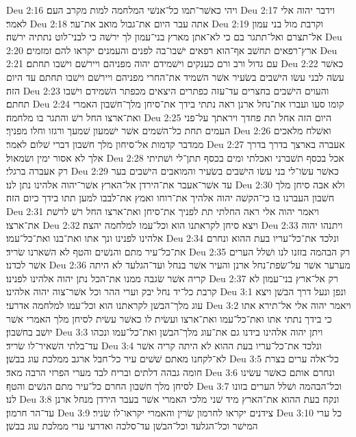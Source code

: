 Deu 2:16  ויהי כאשׁר־תמו כל־אנשׁי המלחמה למות מקרב העם׃
Deu 2:17  וידבר יהוה אלי לאמר׃
Deu 2:18  אתה עבר היום את־גבול מואב את־ער׃
Deu 2:19  וקרבת מול בני עמון אל־תצרם ואל־תתגר בם כי לא־אתן מארץ בני־עמון לך ירשׁה כי לבני־לוט נתתיה ירשׁה׃
Deu 2:20  ארץ־רפאים תחשׁב אף־הוא רפאים ישׁבו־בה לפנים והעמנים יקראו להם זמזמים׃
Deu 2:21  עם גדול ורב ורם כענקים וישׁמידם יהוה מפניהם ויירשׁם וישׁבו תחתם׃
Deu 2:22  כאשׁר עשׂה לבני עשׂו הישׁבים בשׂעיר אשׁר השׁמיד את־החרי מפניהם ויירשׁם וישׁבו תחתם עד היום הזה׃
Deu 2:23  והעוים הישׁבים בחצרים עד־עזה כפתרים היצאים מכפתר השׁמידם וישׁבו תחתם׃
Deu 2:24  קומו סעו ועברו את־נחל ארנן ראה נתתי בידך את־סיחן מלך־חשׁבון האמרי ואת־ארצו החל רשׁ והתגר בו מלחמה׃
Deu 2:25  היום הזה אחל תת פחדך ויראתך על־פני העמים תחת כל־השׁמים אשׁר ישׁמעון שׁמעך ורגזו וחלו מפניך׃
Deu 2:26  ואשׁלח מלאכים ממדבר קדמות אל־סיחון מלך חשׁבון דברי שׁלום לאמר׃
Deu 2:27  אעברה בארצך בדרך בדרך אלך לא אסור ימין ושׂמאול׃
Deu 2:28  אכל בכסף תשׁברני ואכלתי ומים בכסף תתן־לי ושׁתיתי רק אעברה ברגלי׃
Deu 2:29  כאשׁר עשׂו־לי בני עשׂו הישׁבים בשׂעיר והמואבים הישׁבים בער עד אשׁר־אעבר את־הירדן אל־הארץ אשׁר־יהוה אלהינו נתן לנו׃
Deu 2:30  ולא אבה סיחן מלך חשׁבון העברנו בו כי־הקשׁה יהוה אלהיך את־רוחו ואמץ את־לבבו למען תתו בידך כיום הזה׃
Deu 2:31  ויאמר יהוה אלי ראה החלתי תת לפניך את־סיחן ואת־ארצו החל רשׁ לרשׁת את־ארצו׃
Deu 2:32  ויצא סיחן לקראתנו הוא וכל־עמו למלחמה יהצה׃
Deu 2:33  ויתנהו יהוה אלהינו לפנינו ונך אתו ואת־בנו ואת־כל־עמו׃
Deu 2:34  ונלכד את־כל־עריו בעת ההוא ונחרם את־כל־עיר מתם והנשׁים והטף לא השׁארנו שׂריד׃
Deu 2:35  רק הבהמה בזזנו לנו ושׁלל הערים אשׁר לכדנו׃
Deu 2:36  מערער אשׁר על־שׂפת־נחל ארנן והעיר אשׁר בנחל ועד־הגלעד לא היתה קריה אשׁר שׂגבה ממנו את־הכל נתן יהוה אלהינו לפנינו׃
Deu 2:37  רק אל־ארץ בני־עמון לא קרבת כל־יד נחל יבק וערי ההר וכל אשׁר־צוה יהוה אלהינו׃
Deu 3:1  ונפן ונעל דרך הבשׁן ויצא עוג מלך־הבשׁן לקראתנו הוא וכל־עמו למלחמה אדרעי׃
Deu 3:2  ויאמר יהוה אלי אל־תירא אתו כי בידך נתתי אתו ואת־כל־עמו ואת־ארצו ועשׂית לו כאשׁר עשׂית לסיחן מלך האמרי אשׁר יושׁב בחשׁבון׃
Deu 3:3  ויתן יהוה אלהינו בידנו גם את־עוג מלך־הבשׁן ואת־כל־עמו ונכהו עד־בלתי השׁאיר־לו שׂריד׃
Deu 3:4  ונלכד את־כל־עריו בעת ההוא לא היתה קריה אשׁר לא־לקחנו מאתם שׁשׁים עיר כל־חבל ארגב ממלכת עוג בבשׁן׃
Deu 3:5  כל־אלה ערים בצרת חומה גבהה דלתים ובריח לבד מערי הפרזי הרבה מאד׃
Deu 3:6  ונחרם אותם כאשׁר עשׂינו לסיחן מלך חשׁבון החרם כל־עיר מתם הנשׁים והטף׃
Deu 3:7  וכל־הבהמה ושׁלל הערים בזונו לנו׃
Deu 3:8  ונקח בעת ההוא את־הארץ מיד שׁני מלכי האמרי אשׁר בעבר הירדן מנחל ארנן עד־הר חרמון׃
Deu 3:9  צידנים יקראו לחרמון שׂרין והאמרי יקראו־לו שׂניר׃
Deu 3:10  כל ערי המישׁר וכל־הגלעד וכל־הבשׁן עד־סלכה ואדרעי ערי ממלכת עוג בבשׁן׃
